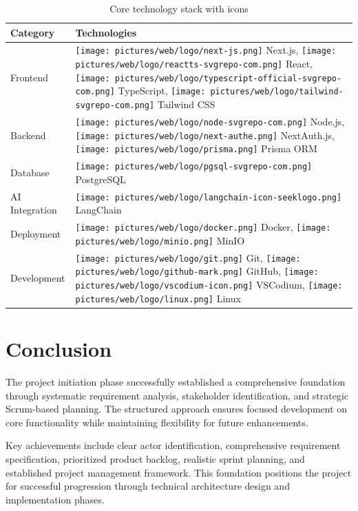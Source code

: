 \begin{table}[h!]
    \centering
    \begin{tabular}{|p{3cm}|p{8cm}|}
        \hline
        \textbf{Category} & \textbf{Technologies} \\ \hline
        
         Frontend & 
        \texttt{[image: pictures/web/logo/next-js.png]} Next.js, 
        \texttt{[image: pictures/web/logo/reactts-svgrepo-com.png]} React, 
        \texttt{[image: pictures/web/logo/typescript-official-svgrepo-com.png]} TypeScript, \newline
        \texttt{[image: pictures/web/logo/tailwind-svgrepo-com.png]} Tailwind CSS \\ \hline
        
         Backend & 
        \texttt{[image: pictures/web/logo/node-svgrepo-com.png]} Node.js, 
        \texttt{[image: pictures/web/logo/next-authe.png]} NextAuth.js, \newline
        \texttt{[image: pictures/web/logo/prisma.png]} Prisma ORM \\ \hline
        
         Database & 
        \texttt{[image: pictures/web/logo/pgsql-svgrepo-com.png]} PostgreSQL \\ \hline
        
         AI Integration & 
        \texttt{[image: pictures/web/logo/langchain-icon-seeklogo.png]} LangChain \\ \hline
        
         Deployment & 
        \texttt{[image: pictures/web/logo/docker.png]} Docker, 
        \texttt{[image: pictures/web/logo/minio.png]} MinIO \\ \hline
        
         Development & 
        \texttt{[image: pictures/web/logo/git.png]} Git, 
        \texttt{[image: pictures/web/logo/github-mark.png]} GitHub, 
        \texttt{[image: pictures/web/logo/vscodium-icon.png]} VSCodium, \newline
        \texttt{[image: pictures/web/logo/linux.png]} Linux \\ \hline
    \end{tabular}
    \caption{Core technology stack with icons}
\end{table}

\section{Conclusion}

The project initiation phase successfully established a comprehensive foundation through systematic requirement analysis, stakeholder identification, and strategic Scrum-based planning. The structured approach ensures focused development on core functionality while maintaining flexibility for future enhancements.

Key achievements include clear actor identification, comprehensive requirement specification, prioritized product backlog, realistic sprint planning, and established project management framework. This foundation positions the project for successful progression through technical architecture design and implementation phases.